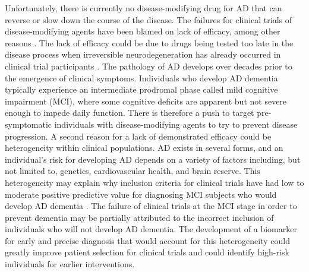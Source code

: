 Unfortunately, there is currently no disease-modifying drug for AD that can reverse or slow down the course of the disease. The failures for clinical trials of disease-modifying agents have been blamed on lack of efficacy, among other reasons \citep{Cummings:2014gn}. The lack of efficacy could be due to drugs being tested too late in the disease process when irreversible neurodegeneration has already occurred in clinical trial participants \citep{Aisen:2013fj}. The pathology of AD develops over decades prior to the emergence of clinical symptoms. Individuals who develop AD dementia typically experience an intermediate prodromal phase called mild cognitive impairment (MCI), where some cognitive deficits are apparent but not severe enough to impede daily function. There is therefore a push to target pre-symptomatic individuals with disease-modifying agents to try to prevent disease progression. A second reason for a lack of demonstrated efficacy could be heterogeneity within clinical populations. AD exists in several forms, and an individual's risk for developing AD depends on a variety of factors including, but not limited to, genetics, cardiovascular health, and brain reserve. This heterogeneity may explain why inclusion criteria for clinical trials have had low to moderate positive predictive value for diagnosing MCI subjects who would develop AD dementia \citep{Visser:2005iw}. The failure of clinical trials at the MCI stage in order to prevent dementia may be partially attributed to the incorrect inclusion of individuals who will not develop AD dementia. The development of a biomarker for early and precise diagnosis that would account for this heterogeneity could greatly improve patient selection for clinical trials and could identify high-risk individuals for earlier interventions. 




